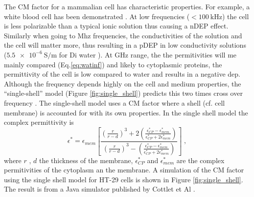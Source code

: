 \documentclass[final]{jyflluk}
\begin{document}
The CM factor for a mammalian cell has characteristic properties. For example, a white blood cell has been demonstrated \cite{voldman_electrical_2006}. At low frequencies ($<\SI{100}{\kilo \Hz}$) the cell is less polarizable than a typical ionic solution thus causing a nDEP effect. Similarly when going to Mhz frequencies, the conductivities of the solution and the cell will matter more, thus resulting in a pDEP in low conductivity solutions ($\SI{5.5e-6}{ \siemens \per \metre}$ for Di water \cite{pashley2005gassed}). At GHz range, the the permitivities will me mainly compared (Eq.\ref{eq:watinf}) and likely to cytoplasmic proteins, the permittivity of the cell is low compared to water and results in a negative dep.  Although the frequency depends highly on the cell and medium properties, the “single-shell” model (Figure \ref{fig:single_shell}) predicts this two times cross over frequency \cite{cetin_dielectrophoresis_2011,pethig_review_2010, voldman_electrical_2006, cottet_mydep_2019}. The single-shell model uses a CM factor where a shell (cf. cell membrane) is accounted for with its own properties. In the single shell model the complex permittivity is
%
\begin{equation}
   \label{eq:shellmodel}
   \epsilon^*=\epsilon_{mem} \left[ \frac{\left( \frac{r}{r-d}\right)^3 + 2\left(\frac{\epsilon_{CP}^* - \epsilon_{mem}^*}{\epsilon_{CP}^* + 2\epsilon_{mem}^*} \right)}{\left( \frac{r}{r-d}\right)^3 -\left(\frac{\epsilon_{CP}^* - \epsilon_{mem}^*}{\epsilon_{CP}^* + 2\epsilon_{mem}^*} \right)}        \right] \;,
\end{equation}
%
where $r$ , $d$ the thickness of the membrane, $\epsilon_{CP}^*$ and  $\epsilon_{mem}^*$ are the complex permitivities of the cytoplasm an the membrane. A simulation of the CM factor using the single shell model for HT-29 cells is shown in Figure \ref{fig:single_shell}. The result is from a Java  simulator published by Cottlet et Al \cite{cottet_mydep_2019}.
\end{document}
